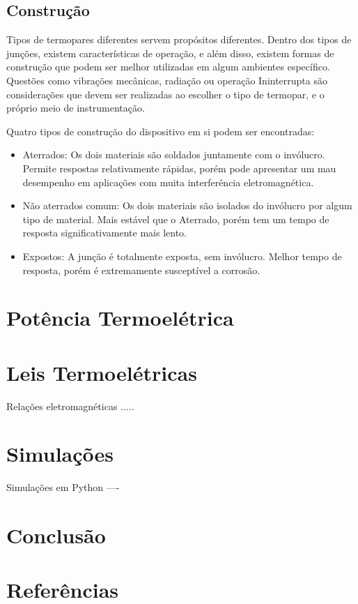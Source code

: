 \documentclass[a4paper,12pt]{report}
\begin{document}
	\subsection{Construção}
	
	Tipos de termopares diferentes servem propósitos diferentes. Dentro dos tipos de junções, existem características de operação, e além disso, existem formas de construção que podem ser melhor utilizadas em algum ambientes específico. Questões como vibrações mecânicas, radiação ou operação Ininterrupta são considerações que devem ser realizadas ao escolher o tipo de termopar, e o próprio meio de instrumentação.
	
	Quatro tipos de construção do dispositivo em si podem ser encontradas:
	
	\begin{itemize}
		\item Aterrados: Os dois materiais são soldados juntamente com o invólucro. Permite respostas relativamente rápidas, porém pode apresentar um mau desempenho em aplicações com muita interferência eletromagnética.
		
		\item Não aterrados comum: Os dois materiais são isolados do invólucro por algum tipo de material. Mais estável que o Aterrado, porém tem um tempo de resposta significativamente mais lento.
		
		\item Expostos: A junção é totalmente exposta, sem invólucro. Melhor tempo de resposta, porém é extremamente susceptível a corrosão.
	\end{itemize}
	
	\section{Potência Termoelétrica}
	
	\section{Leis Termoelétricas}
	
	Relações eletromagnéticas .....
	
	\section{Simulações}
	
	Simulações em Python ----
	
	\section{Conclusão}
	
	\section{Referências}
	\nocite{*}
	
	
	
\end{document}
